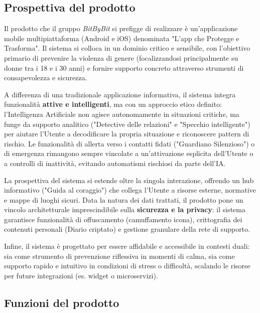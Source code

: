 \documentclass[a4paper,12pt]{article}
\begin{document}

\subsection{Prospettiva del prodotto} \label{sec:prospettiva_prodotto}
Il prodotto che il gruppo \textit{BitByBit} si prefigge di realizzare è un'applicazione mobile multipiattaforma (Android e iOS) denominata "L'app che Protegge e Trasforma". Il sistema si colloca in un dominio critico e sensibile, con l'obiettivo primario di prevenire la violenza di genere (focalizzandosi principalmente su donne tra i 18 e i 30 anni) e fornire supporto concreto attraverso strumenti di consapevolezza e sicurezza.

A differenza di una tradizionale applicazione informativa, il sistema integra funzionalità \textbf{attive e intelligenti}, ma con un approccio etico definito: l'Intelligenza Artificiale non agisce autonomamente in situazioni critiche, ma funge da supporto analitico ("Detective delle relazioni" e "Specchio intelligente") per aiutare l'Utente a decodificare la propria situazione e riconoscere pattern di rischio. Le funzionalità di allerta verso i contatti fidati ("Guardiano Silenzioso") o di emergenza rimangono sempre vincolate a un'attivazione esplicita dell'Utente o a controlli di inattività, evitando automatismi rischiosi da parte dell'IA.

La prospettiva del sistema si estende oltre la singola interazione, offrendo un hub informativo ("Guida al coraggio") che collega l'Utente a risorse esterne, normative e mappe di luoghi sicuri. Data la natura dei dati trattati, il prodotto pone un vincolo architetturale imprescindibile sulla \textbf{sicurezza e la privacy}: il sistema garantisce funzionalità di offuscamento (camuffamento icona), crittografia dei contenuti personali (Diario criptato) e gestione granulare della rete di supporto.

Infine, il sistema è progettato per essere affidabile e accessibile in contesti duali: sia come strumento di prevenzione riflessiva in momenti di calma, sia come supporto rapido e intuitivo in condizioni di stress o difficoltà, scalando le risorse per future integrazioni (es. widget o microservizi).


\subsection{Funzioni del prodotto} \label{sec:funzioni_prodotto}
\end{document}
